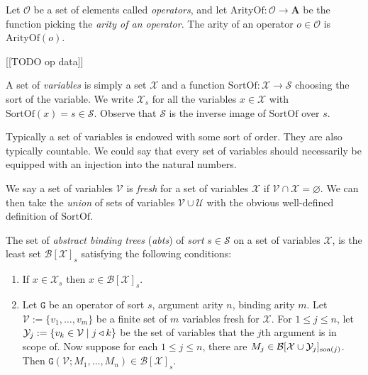\begin{defin}\label{op}
    Let $\mathcal{O}$ be a set of elements called \emph{operators}, and let $\mathrm{ArityOf} : \mathcal{O} \to \mathbf{A}$ be the function picking the \emph{arity of an operator}. The arity of an operator $o\in \mathcal{O}$ is $\mathrm{ArityOf}(o)$.
\end{defin}

\begin{remark}\label{opdata}
    [[TODO op data]]
\end{remark}

\begin{defin}\label{variables}
    A set of \emph{variables} is simply a set $\mathcal{X}$ and a function $\mathrm{SortOf} : \mathcal{X} \to \mathcal{S}$ choosing the sort of the variable. We write $\mathcal{X}_s$ for all the variables $x \in \mathcal{X}$ with $\mathrm{SortOf}(x) = s \in \mathcal{S}$. Observe that $\mathcal{S}$ is the inverse image of $\mathrm{SortOf}$ over $s$.
\end{defin}

\begin{remark}\label{var_order}
    Typically a set of variables is endowed with some sort of order. They are also typically countable. We could say that every set of variables should necessarily be equipped with an injection into the natural numbers.
\end{remark}

\begin{defin}
    We say a set of variables $\mathcal{V}$ is \emph{fresh} for a set of variables $\mathcal{X}$ if $\mathcal{V} \cap \mathcal{X} = \varnothing$. We can then take the \emph{union} of sets of variables $\mathcal{V} \cup \mathcal{U}$ with the obvious well-defined definition of $\mathrm{SortOf}$.
\end{defin}

\begin{defin}\label{abt}
    The set of \emph{abstract binding trees} (\emph{abts}) of \emph{sort} $s\in \mathcal{S}$ on a set of variables $\mathcal{X}$, is the least set $\mathcal{B}[\mathcal{X}]_s$ satisfying the following conditions:
    \begin{enumerate}
        \item If $x \in \mathcal{X}_s$ then $x \in \mathcal{B}[\mathcal{X}]_s$.
        \item Let $\mathtt{G}$ be an operator of sort $s$, argument arity $n$, binding arity $m$. Let $\mathcal{V} := \{v_1, \dots , v_m \}$ be a finite set of $m$ variables fresh for $\mathcal{X}$. For $1 \le j \le n$, let $\mathcal{Y}_j := \{ v_k \in \mathcal{V} \mid j \triangleleft k\}$ be the set of variables that the $j$th argument is in scope of. Now suppose for each $1 \le j \le n$, there are $M_j \in \mathcal{B}[\mathcal{X} \cup \mathcal{Y}_j]_{\text{soa}(j)}$. Then $\mathtt{G}(\mathcal{V}; M_1, \dots, M_n) \in \mathcal{B}[\mathcal{X}]_s$.
    \end{enumerate}
    
\end{defin}

